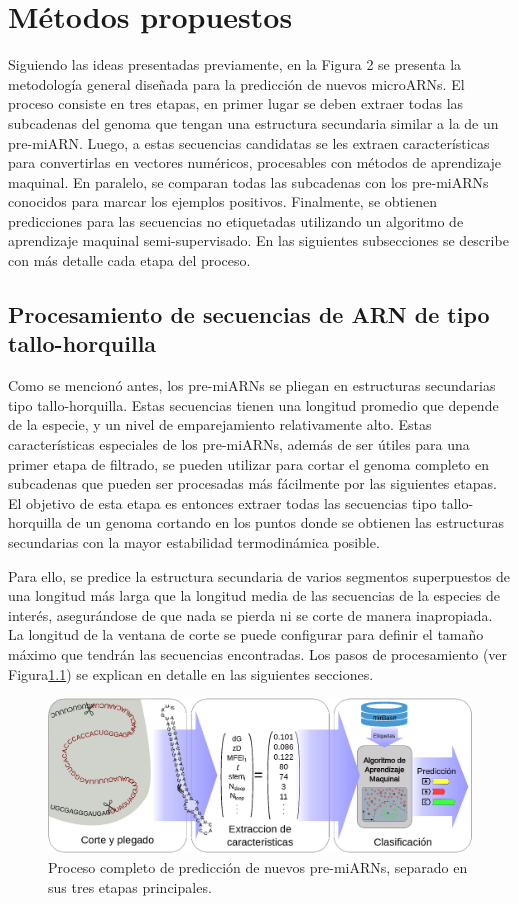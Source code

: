 \chapter{Métodos propuestos}
Siguiendo las ideas presentadas previamente, en la Figura 2 se presenta la metodología general diseñada para la predicción de nuevos microARNs. El proceso
consiste en tres etapas, en primer lugar se deben extraer todas las subcadenas del genoma que tengan una estructura secundaria similar a la de un pre-miARN.
Luego, a estas secuencias candidatas se les extraen características para convertirlas en vectores numéricos, procesables con métodos de aprendizaje maquinal. En
paralelo, se comparan todas las subcadenas con los pre-miARNs conocidos para marcar los ejemplos positivos. Finalmente, se obtienen predicciones para las
secuencias no etiquetadas utilizando un algoritmo de aprendizaje maquinal semi-supervisado. En las siguientes subsecciones se describe con más detalle cada
etapa del proceso.

\section{Procesamiento de secuencias de ARN de tipo tallo-horquilla}
Como se mencionó antes, los pre-miARNs se pliegan en estructuras secundarias tipo tallo-horquilla. Estas secuencias tienen una longitud promedio que depende de
la especie, y un nivel de emparejamiento relativamente alto. Estas características especiales de los pre-miARNs, además de ser útiles para una primer etapa de
filtrado, se pueden utilizar para cortar el genoma completo en subcadenas que pueden ser procesadas más fácilmente por las siguientes etapas. El objetivo de
esta etapa es entonces extraer todas las secuencias tipo tallo-horquilla de un genoma cortando en los puntos donde se obtienen las estructuras secundarias con
la mayor estabilidad termodinámica posible.

Para ello, se predice la estructura secundaria de varios segmentos superpuestos de una longitud más larga que la longitud media de las secuencias de la especies
de interés, asegurándose de que nada se pierda ni se corte de manera inapropiada. La longitud de la ventana de corte se puede configurar para definir el tamaño
máximo que tendrán las secuencias encontradas. Los pasos de procesamiento (ver Figura\ref{fig:esquema}) se explican en detalle en las siguientes secciones.

\begin{figure}[tpb]
	\centering
	\includegraphics[width=\textwidth]{fig/diagrama.eps}
	\caption[Etapas de la predicción de microARN]{Proceso completo de predicción de nuevos pre-miARNs, separado en sus tres etapas principales.}
	\label{fig:esquema}
\end{figure}

